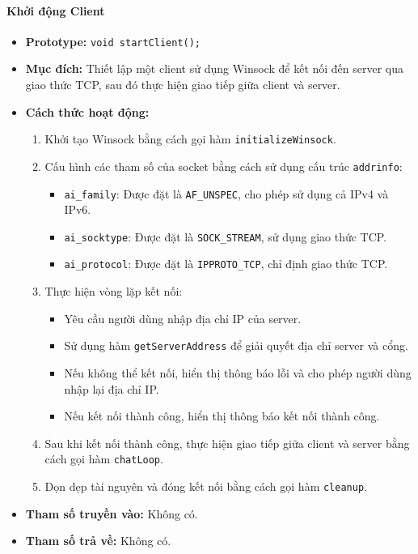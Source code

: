 \paragraph{\textbf{Khởi động Client}}
\begin{itemize}
    \item \textbf{Prototype:} \texttt{void startClient();}
    
    \item \textbf{Mục đích:} Thiết lập một client sử dụng Winsock để kết nối đến server qua giao thức TCP, sau đó thực hiện giao tiếp giữa client và server.
    
    \item \textbf{Cách thức hoạt động:} 
    \begin{enumerate}
        \item Khởi tạo Winsock bằng cách gọi hàm \texttt{initializeWinsock}.
        \item Cấu hình các tham số của socket bằng cách sử dụng cấu trúc \texttt{addrinfo}:
        \begin{itemize}
            \item \texttt{ai\_family}: Được đặt là \texttt{AF\_UNSPEC}, cho phép sử dụng cả IPv4 và IPv6.
            \item \texttt{ai\_socktype}: Được đặt là \texttt{SOCK\_STREAM}, sử dụng giao thức TCP.
            \item \texttt{ai\_protocol}: Được đặt là \texttt{IPPROTO\_TCP}, chỉ định giao thức TCP.
        \end{itemize}
        \item Thực hiện vòng lặp kết nối:
        \begin{itemize}
            \item Yêu cầu người dùng nhập địa chỉ IP của server.
            \item Sử dụng hàm \texttt{getServerAddress} để giải quyết địa chỉ server và cổng.
            \item Nếu không thể kết nối, hiển thị thông báo lỗi và cho phép người dùng nhập lại địa chỉ IP.
            \item Nếu kết nối thành công, hiển thị thông báo kết nối thành công.
        \end{itemize}
        \item Sau khi kết nối thành công, thực hiện giao tiếp giữa client và server bằng cách gọi hàm \texttt{chatLoop}.
        \item Dọn dẹp tài nguyên và đóng kết nối bằng cách gọi hàm \texttt{cleanup}.
    \end{enumerate}
    
    \item \textbf{Tham số truyền vào:} Không có.
    
    \item \textbf{Tham số trả về:} Không có.
\end{itemize}


